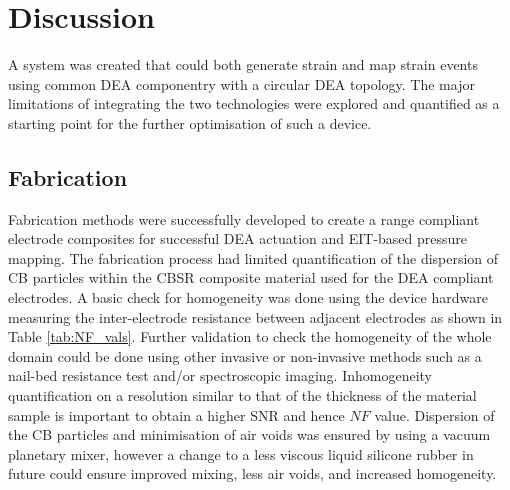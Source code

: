 \section{Discussion}
\label{sec:disscusion}
A system was created that could both generate strain and map strain events using common DEA componentry with a circular DEA topology. The major limitations of integrating the two technologies were explored and quantified as a starting point for the further optimisation of such a device. 


\subsection{Fabrication}
Fabrication methods were successfully developed to create a range compliant electrode composites for successful DEA actuation and EIT-based pressure mapping. The fabrication process had limited quantification of the dispersion of CB particles within the CBSR composite material used for the DEA compliant electrodes. A basic check for homogeneity was done using the device hardware measuring the inter-electrode resistance between adjacent electrodes as shown in Table \ref{tab:NF_vals}. Further validation to check the homogeneity of the whole domain could be done using other invasive or non-invasive methods such as a nail-bed resistance test and/or spectroscopic imaging. Inhomogeneity quantification on a resolution similar to that of the thickness of the material sample is important to obtain a higher SNR and hence $N\!F$ value. Dispersion of the CB particles and minimisation of air voids was ensured by using a vacuum planetary mixer, however a change to a less viscous liquid silicone rubber in future could ensure improved mixing, less air voids, and increased homogeneity. 

